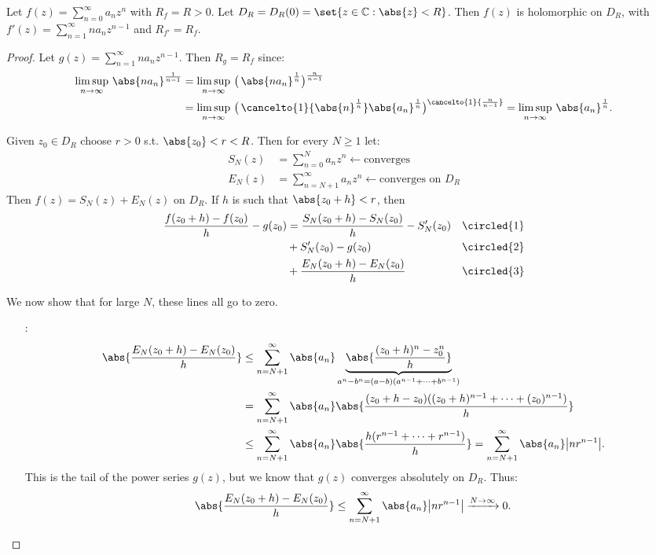 \begin{theorem}\label{thm:power-series-implies-CR}
Let $f(z)= \sum_{n=0}^\infty a_n z^n$ with $R_f = R>0$. Let $D_R = D_R(0) = \set{z\in \mathbb{C} : \abs{z}<R }$. Then $f(z)$ is holomorphic on $D_R$, with $f'(z)= \sum_{n=1}^\infty na_n z^{n-1}$ and $R_{f'} = R_f$.
\end{theorem}

\begin{proof}
Let $g(z) = \sum_{n=1}^\infty na_n z^{n-1}$. Then $R_g=R_f$ since:
\begin{align*}
    \limsup\limits_{n\rightarrow \infty} \, \abs{na_n}^\frac{1}{n-1} &= \limsup\limits_{n\rightarrow \infty} \, \big( \, \abs{na_n}^\frac{1}{n}\big)^{\frac{n}{n-1}}\\
    &= \limsup\limits_{n\rightarrow \infty} \, \big( \, \cancelto{1}{\abs{n}^\frac{1}{n}}\abs{a_n}^\frac{1}{n}\big)^{\cancelto{1}{\frac{n}{n-1}}} = \limsup\limits_{n\rightarrow \infty} \, \abs{a_n}^\frac{1}{n}.
\end{align*}

Given $z_0 \in D_R$ choose $r>0$ s.t. $\abs{z_0}<r<R$. Then for every $N\geq 1$ let:
\begin{align*}
    S_N(z) &= \sum_{n=0}^N a_nz^n \leftarrow \text{converges}\\
    E_N(z) &= \sum_{n=N+1}^\infty a_nz^n \leftarrow \text{converges on $D_R$}
\end{align*}
Then $f(z) = S_N(z)+E_N(z)$ on $D_R$. If $h$ is such that $\abs{z_0+h}<r$, then
\begin{align*}
    \frac{f(z_0+h)-f(z_0)}{h} - g(z_0)
    & = \frac{S_N(z_0+h)-S_N(z_0)}{h} - S_N'(z_0)&& \circled{1} \\& +S_N'(z_0)-g(z_0)&& \circled{2} \\& +\frac{E_N(z_0+h)-E_N(z_0)}{h} && \circled{3}
\end{align*}

We now show that for large $N$, these lines all go to zero.

\begin{itemize}
    

    \item[\circled{3} :]
    \begin{align*}
        \abs{\frac{E_N(z_0+h)-E_N(z_0)}{h}} &\leq \sum_{n=N+1}^\infty \abs{a_n} \underbrace{\abs{\frac{(z_0+h)^n-z_0^n}{h}}}_{a^n-b^n=(a-b)(a^{n-1}+\cdots+b^{n-1})}\\
        &= \sum_{n=N+1}^\infty \abs{a_n} \abs{\frac{(z_0+h-z_0)((z_0+h)^{n-1}+\cdots+(z_0)^{n-1})}{h}}\\
        &\leq \sum_{n=N+1}^\infty \abs{a_n} \abs{\frac{h(r^{n-1}+\cdots+r^{n-1})}{h}} = \sum_{n=N+1}^\infty \abs{a_n} \big|nr^{n-1}\big|.
    \end{align*}
    This is the tail of the power series $g(z)$, but we know that $g(z)$ converges absolutely on $D_R$. Thus:
    \begin{align*}
        \abs{\frac{E_N(z_0+h)-E_N(z_0)}{h}} \leq \sum_{n=N+1}^\infty \abs{a_n} \big|nr^{n-1}\big| \xrightarrow[]{N \to \infty} 0.
    \end{align*}
    

\end{itemize}
\end{proof}
